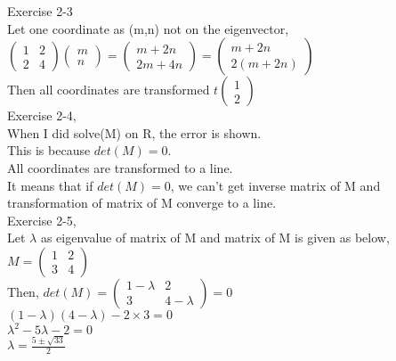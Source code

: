 \documentclass[11pt, oneside]{article}   	%
\begin{document}
Exercise 2-3\\
Let one coordinate as (m,n) not on the eigenvector,\\
$\begin{pmatrix}
 1 & 2\\
 2 & 4
\end{pmatrix}
\begin{pmatrix}
 m\\
 n
\end{pmatrix}= \begin{pmatrix}
 m+2n\\
 2m+4n
\end{pmatrix}= \begin{pmatrix}
 m+2n\\
 2(m+2n)
\end{pmatrix}$\\
Then all coordinates are transformed $ t\begin{pmatrix}
 1\\
 2
\end{pmatrix}$\\

Exercise 2-4,\\
When I did solve(M) on R, the error is shown.\\
This is because $det (M) = 0$.\\
All coordinates are transformed to a line.\\
It means that if $det (M) = 0$, we can't get inverse matrix of M and transformation of matrix of M converge to a line.\\

Exercise 2-5,\\
Let $\lambda$ as eigenvalue of matrix of M and matrix  of M is given as below,\\
$M=
\begin{pmatrix}
 1 & 2\\
 3 & 4
\end{pmatrix}$\\
Then,
$det(M) =\begin{pmatrix}
 1- \lambda  & 2\\
 3 & 4- \lambda
\end{pmatrix}= 0$\\
$(1- \lambda)(4- \lambda)-2\times3 = 0$\\
$ \lambda^2 - 5 \lambda -2= 0$\\
$ \lambda =\frac{5 \pm \sqrt{33}}{2}$\\
\end{document}
